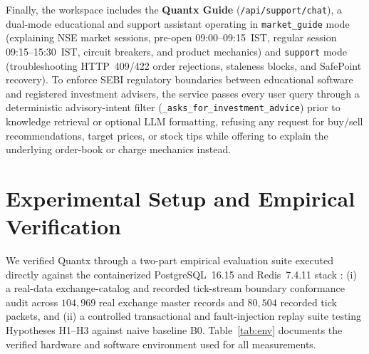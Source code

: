 \documentclass[journal,onecolumn,10pt]{IEEEtran}
\begin{document}
Finally, the workspace includes the \textbf{Quantx Guide} (\texttt{/api/support/chat}), a dual-mode educational and support assistant operating in \texttt{market\_guide} mode (explaining NSE market sessions, pre-open 09:00--09:15~IST, regular session 09:15--15:30~IST, circuit breakers, and product mechanics) and \texttt{support} mode (troubleshooting HTTP~409/422 order rejections, staleness blocks, and SafePoint recovery). To enforce SEBI regulatory boundaries between educational software and registered investment advisers, the service passes every user query through a deterministic advisory-intent filter (\texttt{\_asks\_for\_investment\_advice}) prior to knowledge retrieval or optional LLM formatting, refusing any request for buy/sell recommendations, target prices, or stock tips while offering to explain the underlying order-book or charge mechanics instead.

\section{Experimental Setup and Empirical Verification}

We verified Quantx through a two-part empirical evaluation suite executed directly against the containerized PostgreSQL~16.15 and Redis~7.4.11 stack \cite{quantx_software,quantx_dataset}: (i) a real-data exchange-catalog and recorded tick-stream boundary conformance audit across $104{,}969$ real exchange master records and $80{,}504$ recorded tick packets, and (ii) a controlled transactional and fault-injection replay suite testing Hypotheses H1--H3 against naive baseline B0. Table~\ref{tab:env} documents the verified hardware and software environment used for all measurements.
\end{document}
